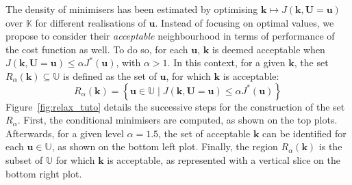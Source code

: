 \documentclass[preprint, review, 1p]{elsarticle}
\newcommand{\Prob}{\mathbb{P}}
\newcommand{\Kspace}{\mathbb{K}}
\newcommand{\Uspace}{\mathbb{U}}
\begin{document}
The density of minimisers has been estimated by optimising $\mathbf{k}\mapsto J(\mathbf{k},\mathbf{U}=\mathbf{u})$ over $\Kspace$ for different realisations of $\mathbf{u}$. Instead of focusing on optimal values, we propose to consider their {\it acceptable} neighbourhood in terms of performance of the cost function as well.
To do so, for each $\mathbf{u}$, $\mathbf{k}$ is deemed acceptable when  $J(\mathbf{k},\mathbf{U}=\mathbf{u}) \leq \alpha J^*(\mathbf{u})$, with $\alpha > 1$. 
%
%
In this context, for a given $\mathbf{k}$, the set $R_{\alpha}(\mathbf{k}) \subseteq \Uspace$ is defined as the set of $\mathbf{u}$, for which $\mathbf{k}$ is acceptable:
\begin{equation}
\label{eq:def_Ralpha}
R_{\alpha}(\mathbf{k}) = \left\{ \mathbf{u} \in \Uspace \mid J(\mathbf{k},\mathbf{U}=\mathbf{u}) \leq \alpha J^*(\mathbf{u}) \right\}
\end{equation}
Figure~\ref{fig:relax_tuto} details the successive steps for the construction of the set $R_{\alpha}$. First, the conditional minimisers are computed, as shown on the top plots. Afterwards, for a given level $\alpha=1.5$, the set of acceptable $\mathbf{k}$ can be identified for each $\mathbf{u} \in \Uspace$, as shown on the bottom left plot. Finally, the region $R_{\alpha}(\mathbf{k})$ is the subset of $\Uspace$ for which $\mathbf{k}$ is acceptable, as represented with a vertical slice on the bottom right plot.

\end{document}
